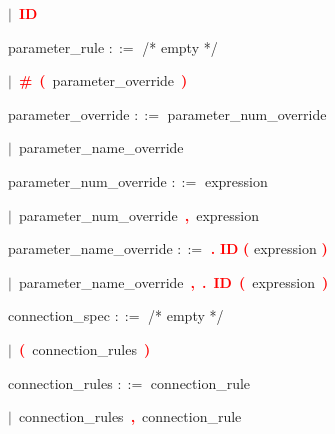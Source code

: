 \mbox{$|$ \textbf{\textcolor{red}{ID}}}

\vspace{1em}
\noindent
\settowidth{\parindent}{\hspace{4ex}}
parameter\_rule $::=$\hspace{1ex} /* empty */

\mbox{$|$ \textbf{\textcolor{red}{\textbf{\textcolor{red}{\#}}}} \textbf{\textcolor{red}{(}} parameter\_override \textbf{\textcolor{red}{)}}}

\vspace{1em}
\noindent
\settowidth{\parindent}{\hspace{4ex}}
parameter\_override $::=$\hspace{1ex} parameter\_num\_override

\mbox{$|$ parameter\_name\_override}

\vspace{1em}
\noindent
\settowidth{\parindent}{\hspace{4ex}}
parameter\_num\_override $::=$\hspace{1ex} expression

\mbox{$|$ parameter\_num\_override \textbf{\textcolor{red}{,}} expression}

\vspace{1em}
\noindent
\settowidth{\parindent}{\hspace{4ex}}
parameter\_name\_override $::=$\hspace{1ex} \textbf{\textcolor{red}{.}} \textbf{\textcolor{red}{ID}} \textbf{\textcolor{red}{(}} expression \textbf{\textcolor{red}{)}}

\mbox{$|$ parameter\_name\_override \textbf{\textcolor{red}{,}} \textbf{\textcolor{red}{.}} \textbf{\textcolor{red}{ID}} \textbf{\textcolor{red}{(}} expression \textbf{\textcolor{red}{)}}}

\vspace{1em}
\noindent
\settowidth{\parindent}{\hspace{4ex}}
connection\_spec $::=$\hspace{1ex} /* empty */

\mbox{$|$ \textbf{\textcolor{red}{(}} connection\_rules \textbf{\textcolor{red}{)}}}

\vspace{1em}
\noindent
\settowidth{\parindent}{\hspace{4ex}}
connection\_rules $::=$\hspace{1ex} connection\_rule

\mbox{$|$ connection\_rules \textbf{\textcolor{red}{,}} connection\_rule}

